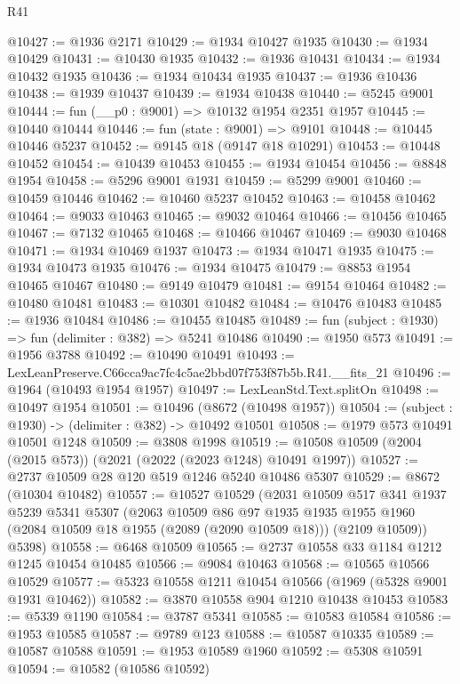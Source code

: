 \begin{lexlean}{R41}
\begin{coremodule}
@10427 := @1936 @2171
@10429 := @1934 @10427 @1935
@10430 := @1934 @10429
@10431 := @10430 @1935
@10432 := @1936 @10431
@10434 := @1934 @10432 @1935
@10436 := @1934 @10434 @1935
@10437 := @1936 @10436
@10438 := @1939 @10437
@10439 := @1934 @10438
@10440 := @5245 @9001
@10444 := fun (__p0 : @9001) => @10132 @1954 @2351 @1957
@10445 := @10440 @10444
@10446 := fun (state : @9001) => @9101
@10448 := @10445 @10446 @5237
@10452 := @9145 @18 (@9147 @18 @10291)
@10453 := @10448 @10452
@10454 := @10439 @10453
@10455 := @1934 @10454
@10456 := @8848 @1954
@10458 := @5296 @9001 @1931
@10459 := @5299 @9001
@10460 := @10459 @10446
@10462 := @10460 @5237 @10452
@10463 := @10458 @10462
@10464 := @9033 @10463
@10465 := @9032 @10464
@10466 := @10456 @10465
@10467 := @7132 @10465
@10468 := @10466 @10467
@10469 := @9030 @10468
@10471 := @1934 @10469 @1937
@10473 := @1934 @10471 @1935
@10475 := @1934 @10473 @1935
@10476 := @1934 @10475
@10479 := @8853 @1954 @10465 @10467
@10480 := @9149 @10479
@10481 := @9154 @10464
@10482 := @10480 @10481
@10483 := @10301 @10482
@10484 := @10476 @10483
@10485 := @1936 @10484
@10486 := @10455 @10485
@10489 := fun (subject : @1930) => fun (delimiter : @382) => @5241 @10486
@10490 := @1950 @573
@10491 := @1956 @3788
@10492 := @10490 @10491
@10493 := LexLeanPreserve.C66cca9ac7fc4c5ae2bbd07f753f87b5b.R41.__fits_21
@10496 := @1964 (@10493 @1954 @1957)
@10497 := LexLeanStd.Text.splitOn
@10498 := @10497 @1954
@10501 := @10496 (@8672 (@10498 @1957))
@10504 := (subject : @1930) -> (delimiter : @382) -> @10492 @10501
@10508 := @1979 @573 @10491 @10501 @1248
@10509 := @3808 @1998
@10519 := @10508 @10509 (@2004 (@2015 @573)) (@2021 (@2022 (@2023 @1248) @10491 @1997))
@10527 := @2737 @10509 @28 @120 @519 @1246 @5240 @10486 @5307
@10529 := @8672 (@10304 @10482)
@10557 := @10527
    @10529
    (@2031
      @10509
      @517
      @341
      @1937
      @5239
      @5341
      @5307
      (@2063
        @10509
        @86
        @97
        @1935
        @1935
        @1955
        @1960
        (@2084 @10509 @18 @1955 (@2089 (@2090 @10509 @18)))
        (@2109 @10509))
      @5398)
@10558 := @6468 @10509
@10565 := @2737 @10558 @33 @1184 @1212 @1245 @10454 @10485
@10566 := @9084 @10463
@10568 := @10565 @10566 @10529
@10577 := @5323 @10558 @1211 @10454 @10566 (@1969 (@5328 @9001 @1931 @10462))
@10582 := @3870 @10558 @904 @1210 @10438 @10453
@10583 := @5339 @1190
@10584 := @3787 @5341
@10585 := @10583 @10584
@10586 := @1953 @10585
@10587 := @9789 @123
@10588 := @10587 @10335
@10589 := @10587 @10588
@10591 := @1953 @10589 @1960
@10592 := @5308 @10591
@10594 := @10582 (@10586 @10592)

\end{coremodule}
\end{lexlean}
